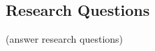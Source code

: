 \documentclass[11pt]{article}
\begin{document}
\subsection{Research Questions}
(answer research questions)

%
%
%
%
%
%
%
%
%
%





\end{document}
